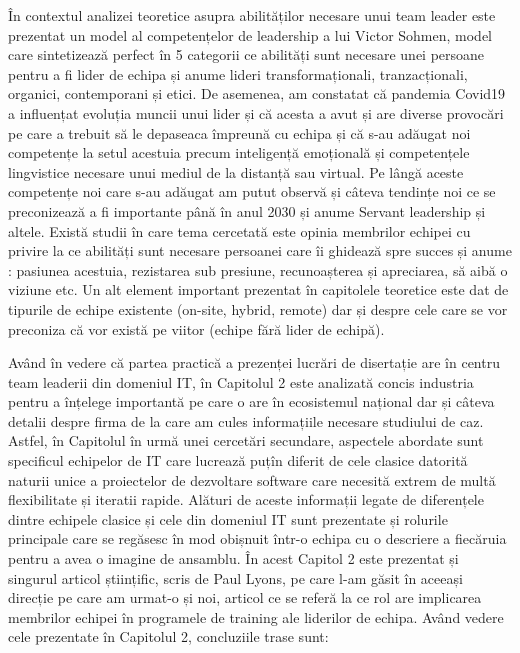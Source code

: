 \documentclass[a4paper, 12pt]{article}
\begin{document}
	\quad  În contextul analizei teoretice asupra abilităților necesare unui team leader este prezentat un model al competențelor de leadership a lui Victor Sohmen, model care sintetizează perfect în 5 categorii ce abilități sunt necesare unei persoane pentru a fi lider de echipa și anume lideri transformaționali, tranzacționali, organici, contemporani și etici. De asemenea, am constatat că pandemia Covid19 a influențat evoluția muncii unui lider și că acesta a avut și are diverse provocări pe care a trebuit să le depaseaca împreună cu echipa și că s-au adăugat noi competențe la setul acestuia precum inteligență emoțională și competențele lingvistice necesare unui mediul de la distanță sau virtual. Pe lângă aceste competențe noi care s-au adăugat am putut observă și câteva tendințe noi ce se preconizează a fi importante până în anul 2030 și anume Servant leadership și altele. Există studii în care tema cercetată este opinia membrilor echipei cu privire la ce abilități sunt necesare persoanei care îi ghidează spre succes și anume : pasiunea acestuia, rezistarea sub presiune, recunoașterea și apreciarea, să aibă o viziune etc. Un alt element important prezentat în capitolele teoretice este dat de tipurile de echipe existente (on-site, hybrid, remote) dar și despre cele care se vor preconiza că vor există pe viitor (echipe fără lider de echipă).

	\quad Având în vedere că partea practică a prezenței lucrări de disertație are în centru team leaderii din domeniul IT, în Capitolul 2 este analizată concis industria pentru a înțelege importantă pe care o are în ecosistemul național dar și câteva detalii despre firma de la care am cules informațiile necesare studiului de caz. Astfel, în Capitolul în urmă unei cercetări secundare, aspectele abordate sunt specificul echipelor de IT care lucrează puțîn diferit de cele clasice datorită naturii unice a proiectelor de dezvoltare software care necesită extrem de multă flexibilitate și iteratii rapide. Alături de aceste informații legate de diferențele dintre echipele clasice și cele din domeniul IT sunt prezentate și rolurile principale care se regăsesc în mod obișnuit într-o echipa cu o descriere a fiecăruia pentru a avea o imagine de ansamblu. În acest Capitol 2 este prezentat și singurul articol științific, scris de Paul Lyons, pe care l-am găsit în aceeași direcție pe care am urmat-o și noi, articol ce se referă la ce rol are implicarea membrilor echipei în programele de training ale liderilor de echipa. Având vedere cele prezentate în Capitolul 2, concluziile trase sunt:
\end{document}
